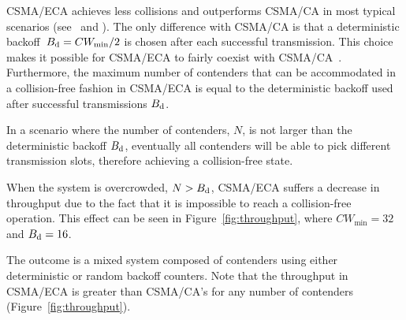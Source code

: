 CSMA/ECA achieves less collisions and outperforms CSMA/CA in most typical scenarios (see~\cite{HE} and \cite{E2CA_performance}). The only difference with CSMA/CA is that a deterministic \mbox{backoff}~\mbox{$B_{\mbox{\scriptsize{d}}}=CW_{\min}/2$} is chosen after each successful transmission. This choice makes it possible for CSMA/ECA to fairly coexist with CSMA/CA~\cite{CSMA_ECA}. Furthermore, the maximum number of contenders that can be accommodated in a collision-free fashion in CSMA/ECA is equal to the deterministic backoff used after successful transmissions $B_{\mbox{\scriptsize{d}}}$.


In a scenario where the number of contenders, $N$, is not larger than the deterministic backoff $B_{\mbox{\scriptsize{d}}}$, eventually all contenders will be able to pick different transmission slots, therefore achieving a collision-free state.

When the system is overcrowded, $N>B_{\mbox{\scriptsize{d}}}$, CSMA/ECA suffers a decrease in throughput due to the fact that it is impossible to reach a collision-free operation. This effect can be seen in Figure~\ref{fig:throughput}, where $CW_{\min}=32$ and $B_{\mbox{\scriptsize{d}}}=16$.




The outcome is a mixed system composed of contenders using either deterministic or random backoff counters. Note that the throughput in CSMA/ECA is greater than CSMA/CA's for any number of contenders (Figure~\ref{fig:throughput}).

